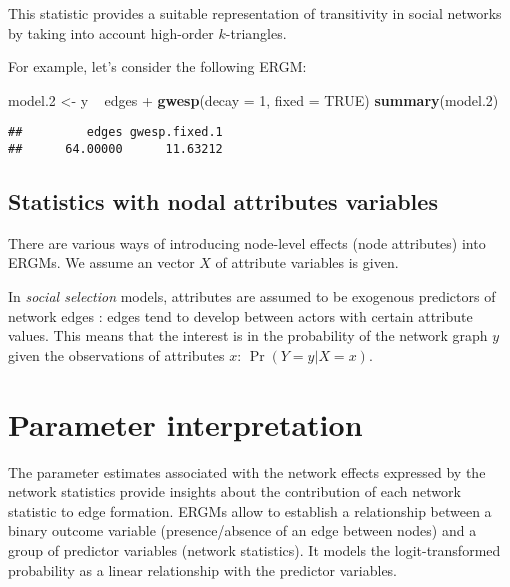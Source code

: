 \documentclass[]{book}
\newenvironment{Shaded}{\begin{snugshade}}{\end{snugshade}}
\newcommand{\KeywordTok}[1]{\textcolor[rgb]{0.13,0.29,0.53}{\textbf{{#1}}}}
\newcommand{\DataTypeTok}[1]{\textcolor[rgb]{0.13,0.29,0.53}{{#1}}}
\newcommand{\DecValTok}[1]{\textcolor[rgb]{0.00,0.00,0.81}{{#1}}}
\newcommand{\FloatTok}[1]{\textcolor[rgb]{0.00,0.00,0.81}{{#1}}}
\newcommand{\StringTok}[1]{\textcolor[rgb]{0.31,0.60,0.02}{{#1}}}
\newcommand{\OtherTok}[1]{\textcolor[rgb]{0.56,0.35,0.01}{{#1}}}
\newcommand{\NormalTok}[1]{{#1}}
\begin{document}
This statistic provides a suitable representation of transitivity in
social networks by taking into account high-order \(k\)-triangles.

For example, let's consider the following ERGM:

\begin{Shaded}
\begin{Highlighting}[]
\NormalTok{model}\FloatTok{.2} \NormalTok{<-}\StringTok{ }\NormalTok{y ~}\StringTok{ }\NormalTok{edges +}\StringTok{ }\KeywordTok{gwesp}\NormalTok{(}\DataTypeTok{decay =} \DecValTok{1}\NormalTok{, }\DataTypeTok{fixed =} \OtherTok{TRUE}\NormalTok{)}
\KeywordTok{summary}\NormalTok{(model}\FloatTok{.2}\NormalTok{)}
\end{Highlighting}
\end{Shaded}

\begin{verbatim}
##         edges gwesp.fixed.1 
##      64.00000      11.63212
\end{verbatim}

\subsection{Statistics with nodal attributes
variables}\label{statistics-with-nodal-attributes-variables}

There are various ways of introducing node-level effects (node
attributes) into ERGMs. We assume an vector \(X\) of attribute variables
is given.

In \emph{social selection} models, attributes are assumed to be
exogenous predictors of network edges \citep{rob:ell:pat01}: edges tend
to develop between actors with certain attribute values. This means that
the interest is in the probability of the network graph \(y\) given the
observations of attributes \(x\): \(\Pr(Y = y|X = x)\).

\section{Parameter interpretation}\label{parameter-interpretation-1}

The parameter estimates associated with the network effects expressed by
the network statistics provide insights about the contribution of each
network statistic to edge formation. ERGMs allow to establish a
relationship between a binary outcome variable (presence/absence of an
edge between nodes) and a group of predictor variables (network
statistics). It models the logit-transformed probability as a linear
relationship with the predictor variables.
\end{document}
